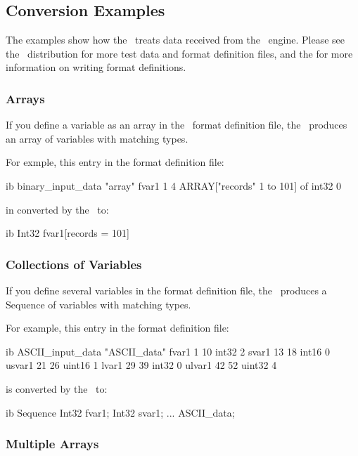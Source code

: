\subsection{Conversion Examples}
\label{sec,examples}

The examples show how the \ffs\ treats data received from the \ffnd\
engine.  Please see the \ffs\ distribution for more test data and
format definition files, and the \chapterref{a} for more information on
writing format definitions.


\subsubsection{Arrays}

If you define a variable as an array in the \ffnd\ format definition
file, the \ffs\ produces an array of variables with matching types.

For exmple, this entry in the format definition file:

\begin{vcode}{ib}
binary_input_data "array"
fvar1 1 4 ARRAY["records" 1 to 101] of int32 0
\end{vcode}

in converted by the \ffs\ to:

\begin{vcode}{ib}
Int32 fvar1[records = 101]
\end{vcode}


\subsubsection{Collections of Variables}

If you define several variables in the format definition file, the
\ffs\ produces a Sequence of variables with matching types.

For example, this entry in the format definition file:

\begin{vcode}{ib}
ASCII_input_data "ASCII_data"
fvar1   1 10  int32 2
svar1  13 18  int16 0
usvar1 21 26 uint16 1
lvar1  29 39  int32 0
ulvar1 42 52 uint32 4
\end{vcode}

is converted by the \ffs\ to:

\begin{vcode}{ib}
Sequence {
  Int32 fvar1;
  Int32 svar1;
  ...
} ASCII_data;
\end{vcode}


\subsubsection{Multiple Arrays}

